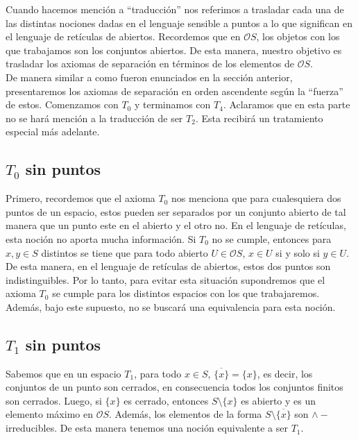 Cuando hacemos mención a ``traducción'' nos referimos a trasladar cada una de las distintas nociones dadas en el lenguaje sensible a puntos a lo que significan en el lenguaje de retículas de abiertos. Recordemos que en $\mathcal{O}S$, los objetos con los que trabajamos son los conjuntos abiertos. De esta manera, nuestro objetivo es trasladar los axiomas de separación en términos de los elementos de $\mathcal{O}S$.\\

De manera similar a como fueron enunciados en la sección anterior, presentaremos los axiomas de separación en orden ascendente según la ``fuerza'' de estos. Comenzamos con $T_0$ y terminamos con $T_4$. Aclaramos que en esta parte no se hará mención a la traducción de ser $T_2$. Esta recibirá un tratamiento especial más adelante.

\subsection{$T_0$ sin puntos}

Primero, recordemos que el axioma $T_0$ nos menciona que para cualesquiera dos puntos de un espacio, estos pueden ser separados por un conjunto abierto de tal manera que un punto este en el abierto y el otro no. En el lenguaje de retículas, esta noción no aporta mucha información. Si $T_0$ no se cumple, entonces para $x, y\in S$ distintos se tiene que para todo abierto $U\in \mathcal{O}S$, $x\in U$ si y solo si $y\in U$.\\

De esta manera, en el lenguaje de retículas de abiertos, estos dos puntos son indistinguibles. Por lo tanto, para evitar esta situación supondremos que el axioma $T_0$ se cumple para los distintos espacios con los que trabajaremos. Además, bajo este supuesto, no se buscará una equivalencia para esta noción.

\subsection{$T_1$ sin puntos}\label{T1s}

Sabemos que en un espacio $T_1$, para todo $x\in S$, $\overline{\{x\}}=\{x\}$, es decir, los conjuntos de un punto son cerrados, en consecuencia todos los conjuntos finitos son cerrados. Luego, si $\{x\}$ es cerrado, entonces $S\setminus \{x\}$ es abierto y es un elemento máximo en $\mathcal{O}S$. Además, los elementos de la forma $S\setminus \overline{\{x\}}$ son $\wedge-$irreducibles. De esta manera tenemos una noción equivalente a ser $T_1$.

